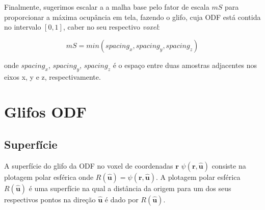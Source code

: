 Finalmente, sugerimos escalar a a malha base pelo fator de escala $mS$ para proporcionar a máxima ocupância em tela, fazendo o glifo, cuja ODF está contida no intervalo $[0, 1]$, caber no seu respectivo \textit{voxel}:

\begin{equation}
\label{eq:spacings}
mS = min(spacing_x, spacing_y, spacing_z)
\end{equation}


onde $spacing_x$, $spacing_y$, $spacing_z$ é o espaço entre duas amostras adjacentes nos eixos x, y e z, respectivamente.








\section{Glifos ODF}
\label{sec::glifos_odf}

\subsection{Superfície}

A superfície do glifo da ODF no voxel de coordenadas $\mathbf{r}$ $\psi(\mathbf{r}, \mathbf{\hat{u}})$ consiste na plotagem polar esférica onde $R(\mathbf{\hat{u}}) = \psi(\mathbf{r}, \mathbf{\hat{u}})$. A plotagem polar esférica $R(\mathbf{\hat{u}})$ é uma superfície na qual a distância da origem para um dos seus respectivos pontos na direção $\mathbf{\hat{u}}$ é dado por $R(\mathbf{\hat{u}})$.



